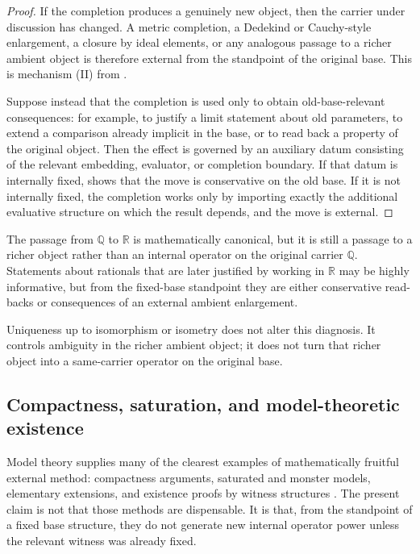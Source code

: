 \begin{proof}
If the completion produces a genuinely new object, then the carrier under discussion has changed. A metric completion, a Dedekind or Cauchy-style enlargement, a closure by ideal elements, or any analogous passage to a richer ambient object is therefore external from the standpoint of the original base. This is mechanism (II) from .

Suppose instead that the completion is used only to obtain old-base-relevant consequences: for example, to justify a limit statement about old parameters, to extend a comparison already implicit in the base, or to read back a property of the original object. Then the effect is governed by an auxiliary datum consisting of the relevant embedding, evaluator, or completion boundary. If that datum is internally fixed,  shows that the move is conservative on the old base. If it is not internally fixed, the completion works only by importing exactly the additional evaluative structure on which the result depends, and the move is external.
\end{proof}

\begin{example}
The passage from $\mathbb{Q}$ to $\mathbb{R}$ is mathematically canonical, but it is still a passage to a richer object rather than an internal operator on the original carrier $\mathbb{Q}$. Statements about rationals that are later justified by working in $\mathbb{R}$ may be highly informative, but from the fixed-base standpoint they are either conservative read-backs or consequences of an external ambient enlargement.
\end{example}

\begin{remark}
Uniqueness up to isomorphism or isometry does not alter this diagnosis. It controls ambiguity in the richer ambient object; it does not turn that richer object into a same-carrier operator on the original base.
\end{remark}

\subsection{Compactness, saturation, and model-theoretic existence}

Model theory supplies many of the clearest examples of mathematically fruitful external method: compactness arguments, saturated and monster models, elementary extensions, and existence proofs by witness structures \citep{ChangKeisler1990,Hodges1993,Marker2002}. The present claim is not that those methods are dispensable. It is that, from the standpoint of a fixed base structure, they do not generate new internal operator power unless the relevant witness was already fixed.

